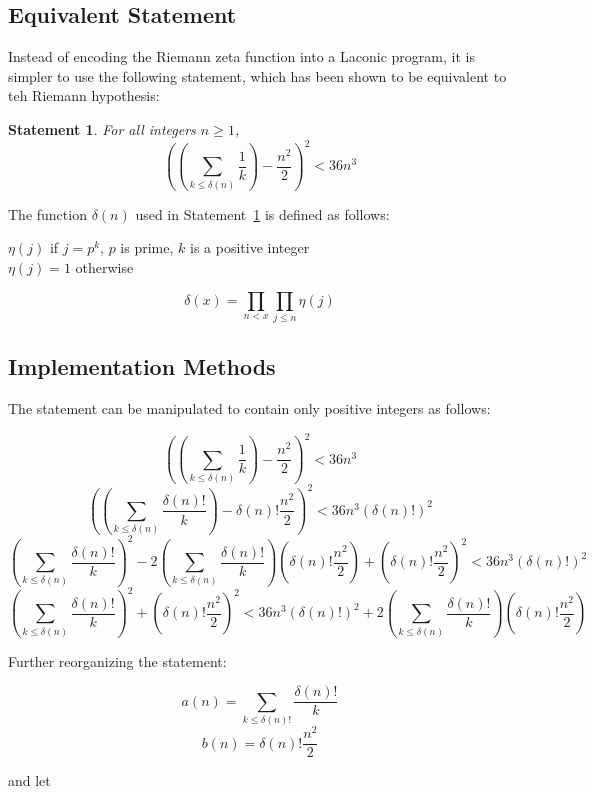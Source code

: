 \documentclass[11pt]{article}
\newtheorem{statement}{Statement}
\newenvironment{nscenter}
 {\parskip=0pt\par\nopagebreak\centering}
 {\par\noindent\ignorespacesafterend}
\begin{document}
\subsection{Equivalent Statement}

Instead of encoding the Riemann zeta function into a Laconic program, it is simpler to use the following statement, which has been shown to be equivalent to teh Riemann hypothesis:~\cite{riemann}\\

\begin{statement} \label{eq:riemann}
For all integers $n \ge 1$, 
$$\left(\left(\sum_{k \le \delta(n)} \frac{1}{k}\right) - \frac{n^2}{2}\right)^2 < 36n^3$$
\end{statement}

The function $\delta(n)$ used in Statement~\ref{eq:riemann} is defined as follows: \\

\begin{nscenter}
$\eta(j)$ if $j = p^k$, $p$ is prime, $k$ is a positive integer \\
$\eta(j) = 1$ otherwise
\end{nscenter}
$$\delta(x) = \prod_{n<x}\prod_{j \le n} \eta(j)$$

\subsection{Implementation Methods}

The statement can be manipulated to contain only positive integers as follows:

$$\left(\left(\sum_{k \le \delta(n)} \frac{1}{k}\right) - \frac{n^2}{2}\right)^2 < 36n^3$$
$$\left(\left(\sum_{k \le \delta(n)} \frac{\delta(n)!}{k}\right) - \delta(n)!\frac{n^2}{2}\right)^2 < 36n^3(\delta(n)!)^2$$
$$\left(\sum_{k \le \delta(n)} \frac{\delta(n)!}{k}\right)^2 - 2\left(\sum_{k \le \delta(n)} \frac{\delta(n)!}{k}\right) \left(\delta(n)!\frac{n^2}{2}\right) + \left(\delta(n)!\frac{n^2}{2}\right)^2 < 36n^3(\delta(n)!)^2$$
$$\left(\sum_{k \le \delta(n)} \frac{\delta(n)!}{k}\right)^2 + \left(\delta(n)!\frac{n^2}{2}\right)^2 < 36n^3(\delta(n)!)^2 + 2\left(\sum_{k \le \delta(n)} \frac{\delta(n)!}{k}\right) \left(\delta(n)!\frac{n^2}{2}\right)$$

Further reorganizing the statement:

$$a(n) = \sum_{k \le \delta(n)!} \frac{\delta(n)!}{k}$$
$$b(n) = \delta(n)!\frac{n^2}{2}$$

and let
\end{document}
